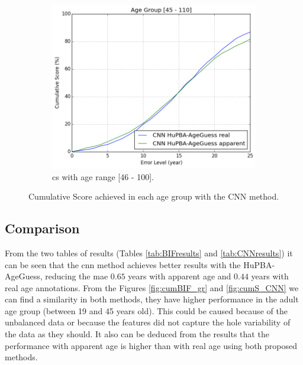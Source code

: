 \begin{figure}[!h]
	\vspace{0.5cm}
	\begin{subfigure}[b]{0.5\textwidth}
		\includegraphics[width=\textwidth]{figures/results_cnn_cum_score_good_ag2}
		\caption{\acrshort{cs} with age range [46 - 100].}
		\label{fig:cumS_CNN_ag2}
	\end{subfigure}
	\caption{Cumulative Score achieved in each age group with the CNN method.}\label{fig:cumCNN_gr}
\end{figure}

\subsection{Comparison}

From the two tables of results (Tables \ref{tab:BIFresults} and \ref{tab:CNNresults}) it can be seen that the \gls{cnn} method achieves better results with the HuPBA-AgeGuess, reducing the \gls{mae} $0.65$ years with apparent age and $0.44$ years with real age annotations. From the Figures \ref{fig:cumBIF_gr} and \ref{fig:cumS_CNN} we can find a similarity in both methods, they have higher performance in the adult age group (between 19 and 45 years old). This could be caused because of the unbalanced data or because the features did not capture the hole variability of the data as they should. It also can be deduced from the results that the performance with apparent age is higher than with real age using both proposed methods. 

